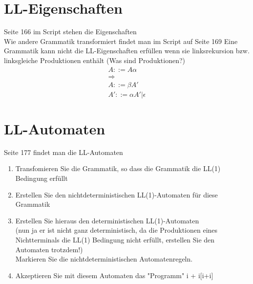 \documentclass[
  ngerman
  ,12pt
  ,pdftex
]{article}
\begin{document}
\newpage

\section{LL-Eigenschaften}
Seite 166 im Script stehen die Eigenschaften \\
Wie andere Grammatik transformiert findet man im Script auf Seite 169
Eine Grammatik kann nicht die LL-Eigenschaften erfüllen wenn sie linksrekursion bzw. linksgleiche Produktionen enthält (Was sind Produktionen?)
\begin{align*}
    A::= A \alpha \\
    \Longrightarrow \\
    A::= \beta A' \\
    A'::=\alpha A' | \epsilon
\end{align*}


\section{LL-Automaten}
Seite 177 findet man die LL-Automaten \\
\begin{enumerate}
  \item Transfomieren Sie die Grammatik, so dass die Grammatik die LL(1) Bedingung erfüllt
  \item Erstellen Sie den nichtdeterministischen LL(1)-Automaten für diese Grammatik
  \item Erstellen Sie hieraus den deterministischen LL(1)-Automaten\\ (nun ja er ist nicht ganz deterministisch, da die Produktionen eines Nichtterminals die LL(1) Bedingung nicht erfüllt, erstellen Sie den Automaten trotzdem!)\\
  Markieren Sie die nichtdeterministischen Automatenregeln.
  \item Akzeptieren Sie mit diesem Automaten das "Programm" i + i[i+i]
\end{enumerate}
\end{document}
